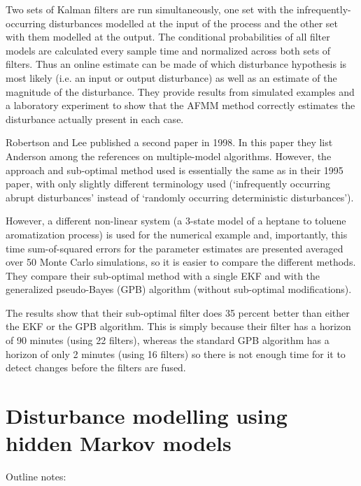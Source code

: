 Two sets of Kalman filters are run simultaneously, one set with the infrequently-occurring disturbances modelled at the input of the process and the other set with them modelled at the output. The conditional probabilities of all filter models are calculated every sample time and normalized across both sets of filters.  Thus an online estimate can be made of which disturbance hypothesis is most likely (i.e. an input or output disturbance) as well as an estimate of the magnitude of the disturbance. They provide results from simulated examples and a laboratory experiment to show that the AFMM method correctly estimates the disturbance actually present in each case.

Robertson and Lee published a second paper in 1998. In this paper they list Anderson \cite{andersson_adaptive_1985} among the references on multiple-model algorithms.  However, the approach and sub-optimal method used is essentially the same as in their 1995 paper, with only slightly different terminology used (`infrequently occurring abrupt disturbances' instead of `randomly occurring deterministic disturbances'). 

However, a different non-linear system (a 3-state model of a heptane to toluene aromatization process) is used for the numerical example and, importantly, this time sum-of-squared errors for the parameter estimates are presented averaged over 50 Monte Carlo simulations, so it is easier to compare the different methods. They compare their sub-optimal method with a single EKF and with the generalized pseudo-Bayes (GPB) algorithm (without sub-optimal modifications).

The results show that their sub-optimal filter does 35 percent better than either the EKF or the GPB algorithm. This is simply because their filter has a horizon of 90 minutes (using 22 filters), whereas the standard GPB algorithm has a horizon of only 2 minutes (using 16 filters) so there is not enough time for it to detect changes before the filters are fused.

\section*{Disturbance modelling using hidden Markov models}
\label{hidden_markov_models}

Outline notes:

